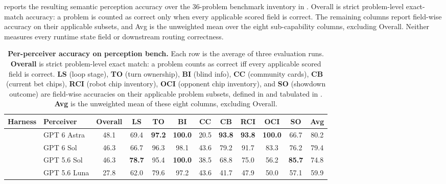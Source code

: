 reports the resulting semantic perception accuracy over the 36-problem benchmark inventory in . Overall is strict problem-level exact-match accuracy: a problem is counted as correct only when every applicable scored field is correct. The remaining columns report field-wise accuracy on their applicable subsets, and Avg is the unweighted mean over the eight sub-capability columns, excluding Overall. Neither measures every runtime state field or downstream routing correctness.
\begin{table}[t]
    \caption{\textbf{Per-perceiver accuracy on perception bench.} Each row is the average of three evaluation runs. \textbf{Overall} is strict problem-level exact match: a problem counts as correct iff every applicable scored field is correct. \textbf{LS} (loop stage), \textbf{TO} (turn ownership), \textbf{BI} (blind info), \textbf{CC} (community cards), \textbf{CB} (current bet chips), \textbf{RCI} (robot chip inventory), \textbf{OCI} (opponent chip inventory), and \textbf{SO} (showdown outcome) are field-wise accuracies on their applicable problem subsets, defined in  and tabulated in . \textbf{Avg} is the unweighted mean of these eight columns, excluding Overall.}
    \label{tab:perception_agent_results}
    \centering
    \small
    \setlength{\tabcolsep}{3pt}
    \renewcommand{\arraystretch}{1.12}
    \setlength{\dashlinedash}{0.6pt}
    \setlength{\dashlinegap}{1.4pt}
    \begin{tabular*}{\linewidth}{@{\extracolsep{\fill}}llc:ccccccccc@{}}
        \toprule
        \textbf{Harness} & \textbf{Perceiver} & \textbf{Overall} & \textbf{LS} & \textbf{TO} & \textbf{BI} & \textbf{CC} & \textbf{CB} & \textbf{RCI} & \textbf{OCI} & \textbf{SO} & \textbf{Avg} \\
        \midrule
         & GPT 6 Astra & 48.1 & 69.4 & \textbf{97.2} & \textbf{100.0} & 20.5 & \textbf{93.8} & \textbf{93.8} & \textbf{100.0} & 66.7 & 80.2 \\
        & GPT 6 Sol & 46.3 & 66.7 & 96.3 & 98.1 & 43.6 & 79.2 & 91.7 & 83.3 & 76.2 & 79.4 \\
        & GPT 5.6 Sol & 46.3 & \textbf{78.7} & 95.4 & \textbf{100.0} & 38.5 & 68.8 & 75.0 & 56.2 & \textbf{85.7} & 74.8 \\
        & GPT 5.6 Luna & 27.8 & 62.0 & 79.6 & 97.2 & 43.6 & 41.7 & 47.9 & 50.0 & 57.1 & 59.9 \\

\end{tabular*}
\end{table}
